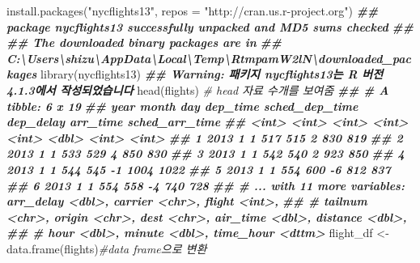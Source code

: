 \documentclass[
]{book}
\newenvironment{Shaded}{\begin{snugshade}}{\end{snugshade}}
\newcommand{\AttributeTok}[1]{\textcolor[rgb]{0.77,0.63,0.00}{#1}}
\newcommand{\CommentTok}[1]{\textcolor[rgb]{0.56,0.35,0.01}{\textit{#1}}}
\newcommand{\DocumentationTok}[1]{\textcolor[rgb]{0.56,0.35,0.01}{\textbf{\textit{#1}}}}
\newcommand{\FunctionTok}[1]{\textcolor[rgb]{0.00,0.00,0.00}{#1}}
\newcommand{\NormalTok}[1]{#1}
\newcommand{\OtherTok}[1]{\textcolor[rgb]{0.56,0.35,0.01}{#1}}
\newcommand{\StringTok}[1]{\textcolor[rgb]{0.31,0.60,0.02}{#1}}
\theoremstyle{definition}
\theoremstyle{definition}
\theoremstyle{definition}
\theoremstyle{definition}
\theoremstyle{remark}
\begin{document}
\begin{Shaded}
\begin{Highlighting}[]
\FunctionTok{install.packages}\NormalTok{(}\StringTok{"nycflights13"}\NormalTok{, }\AttributeTok{repos =} \StringTok{"http://cran.us.r{-}project.org"}\NormalTok{)}
\DocumentationTok{\#\# package \textquotesingle{}nycflights13\textquotesingle{} successfully unpacked and MD5 sums checked}
\DocumentationTok{\#\# }
\DocumentationTok{\#\# The downloaded binary packages are in}
\DocumentationTok{\#\#  C:\textbackslash{}Users\textbackslash{}shizu\textbackslash{}AppData\textbackslash{}Local\textbackslash{}Temp\textbackslash{}RtmpamW2lN\textbackslash{}downloaded\_packages}
\FunctionTok{library}\NormalTok{(nycflights13)}
\DocumentationTok{\#\# Warning: 패키지 \textquotesingle{}nycflights13\textquotesingle{}는 R 버전 4.1.3에서 작성되었습니다}
\FunctionTok{head}\NormalTok{(flights) }\CommentTok{\# head 자료 수개를 보여줌}
\DocumentationTok{\#\# \# A tibble: 6 x 19}
\DocumentationTok{\#\#    year month   day dep\_time sched\_dep\_time dep\_delay arr\_time sched\_arr\_time}
\DocumentationTok{\#\#   \textless{}int\textgreater{} \textless{}int\textgreater{} \textless{}int\textgreater{}    \textless{}int\textgreater{}          \textless{}int\textgreater{}     \textless{}dbl\textgreater{}    \textless{}int\textgreater{}          \textless{}int\textgreater{}}
\DocumentationTok{\#\# 1  2013     1     1      517            515         2      830            819}
\DocumentationTok{\#\# 2  2013     1     1      533            529         4      850            830}
\DocumentationTok{\#\# 3  2013     1     1      542            540         2      923            850}
\DocumentationTok{\#\# 4  2013     1     1      544            545        {-}1     1004           1022}
\DocumentationTok{\#\# 5  2013     1     1      554            600        {-}6      812            837}
\DocumentationTok{\#\# 6  2013     1     1      554            558        {-}4      740            728}
\DocumentationTok{\#\# \# ... with 11 more variables: arr\_delay \textless{}dbl\textgreater{}, carrier \textless{}chr\textgreater{}, flight \textless{}int\textgreater{},}
\DocumentationTok{\#\# \#   tailnum \textless{}chr\textgreater{}, origin \textless{}chr\textgreater{}, dest \textless{}chr\textgreater{}, air\_time \textless{}dbl\textgreater{}, distance \textless{}dbl\textgreater{},}
\DocumentationTok{\#\# \#   hour \textless{}dbl\textgreater{}, minute \textless{}dbl\textgreater{}, time\_hour \textless{}dttm\textgreater{}}
\NormalTok{flight\_df }\OtherTok{\textless{}{-}}\FunctionTok{data.frame}\NormalTok{(flights)}\CommentTok{\#data frame으로 변환}

\end{Highlighting}
\end{Shaded}
\end{document}
